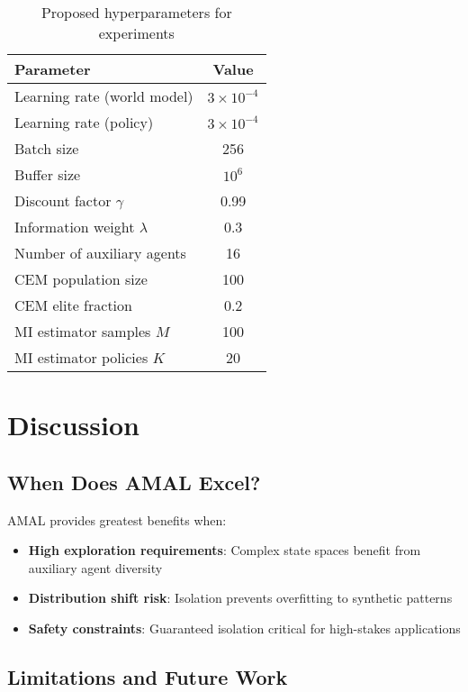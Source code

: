 \documentclass[12pt, a4paper]{article}
\begin{document}
\begin{table}[h]
\centering
\caption{Proposed hyperparameters for experiments}
\begin{tabular}{lc}
\toprule
\textbf{Parameter} & \textbf{Value} \\
\midrule
Learning rate (world model) & $3 \times 10^{-4}$ \\
Learning rate (policy) & $3 \times 10^{-4}$ \\
Batch size & 256 \\
Buffer size & $10^6$ \\
Discount factor $\gamma$ & 0.99 \\
Information weight $\lambda$ & 0.3 \\
Number of auxiliary agents & 16 \\
CEM population size & 100 \\
CEM elite fraction & 0.2 \\
MI estimator samples $M$ & 100 \\
MI estimator policies $K$ & 20 \\
\bottomrule
\end{tabular}
\end{table}

\section{Discussion}

\subsection{When Does AMAL Excel?}

AMAL provides greatest benefits when:
\begin{itemize}
\item \textbf{High exploration requirements}: Complex state spaces benefit from auxiliary agent diversity
\item \textbf{Distribution shift risk}: Isolation prevents overfitting to synthetic patterns
\item \textbf{Safety constraints}: Guaranteed isolation critical for high-stakes applications
\end{itemize}

\subsection{Limitations and Future Work}
\end{document}
